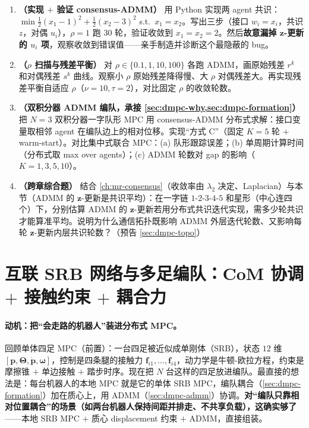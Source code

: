 \begin{exercise}
\begin{enumerate}
  \item \textbf{（实现 $+$ 验证 consensus-ADMM）} 用 Python 实现两 agent 共识：$\min \tfrac12(x_1-1)^2+\tfrac12(x_2-3)^2$ s.t.\ $x_1=x_2$。写出三步（接口 $w_i=x_i$，共识 $z$，对偶 $u_i$），$\rho=1$ 跑 $30$ 轮，验证收敛到 $x_1=x_2=2$。然后\textbf{故意漏掉 $\mathbf{z}$-更新的 $u_i$ 项}，观察收敛到错误值——亲手制造并诊断这个最隐蔽的 bug。
  \item \textbf{（$\rho$ 扫描与残差平衡）} 对 $\rho\in\{0.1,1,10,100\}$ 各跑 ADMM，画原始残差 $r^k$ 和对偶残差 $s^k$ 曲线。观察小 $\rho$ 原始残差降得慢、大 $\rho$ 对偶残差大。再实现残差平衡自适应 $\rho$（$\nu=10,\tau=2$），对比固定 $\rho$ 的收敛轮数。
  \item \textbf{（双积分器 ADMM 编队，承接 \cref{sec:dmpc-why,sec:dmpc-formation}）} 把 $N=3$ 双积分器一字队形 MPC 用 consensus-ADMM 分布式求解：接口变量取相邻 agent 在编队边上的相对位移。实现“方式 C”（固定 $K=5$ 轮 $+$ warm-start）。对比集中式联合 MPC：(a) 队形跟踪误差；(b) 单周期计算时间（分布式取 max over agents）；(c) ADMM 轮数对 gap 的影响（$K=1,3,5,10$）。
  \item \textbf{（跨章综合题）} 结合 \cref{ch:mr-consensus}（收敛率由 $\lambda_2$ 决定、Laplacian）与本节（ADMM 的 $\mathbf{z}$-更新是共识平均）：在一字链 $1$-$2$-$3$-$4$-$5$ 和星形（中心连四个）下，分别估算 ADMM 的 $\mathbf{z}$-更新若用分布式共识迭代实现，需多少轮共识才能算准平均。说明为什么通信拓扑既影响 ADMM 外层迭代轮数、又影响每轮 $\mathbf{z}$-更新内层共识轮数？（预告 \cref{sec:dmpc-topo}）
\end{enumerate}
\end{exercise}

\section{互联 SRB 网络与多足编队：CoM 协调 \texorpdfstring{$+$}{+} 接触约束 \texorpdfstring{$+$}{+} 耦合力}
\label{sec:dmpc-srb}

\paragraph{动机：把“会走路的机器人”装进分布式 MPC。}
回顾单体四足 MPC（前置）：一台四足被近似成单刚体（SRB），状态 $12$ 维 $[\mathbf{p},\boldsymbol{\Theta},\dot{\mathbf{p}},\boldsymbol{\omega}]$，控制是四条腿的接触力 $\mathbf{f}_{i1},\dots,\mathbf{f}_{i4}$，动力学是牛顿-欧拉方程，约束是摩擦锥 $+$ 单边接触 $+$ 踏步时序。现在把 $N$ 台这样的四足放进编队。最直接的想法是：每台机器人的本地 MPC 就是它的单体 SRB MPC，编队耦合（\cref{sec:dmpc-formation}）加在质心上，用 ADMM（\cref{sec:dmpc-admm}）协调。\textbf{对“编队只靠相对位置耦合”的场景（如两台机器人保持间距并排走、不共享负载），这确实够了}——本地 SRB MPC $+$ 质心 displacement 约束 $+$ ADMM，直接组装。

